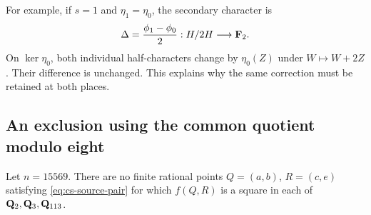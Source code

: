 For example, if $s=1$ and $\eta_1=\eta_0$, the secondary character is
\[
 \Delta=\frac{\phi_1-\phi_0}{2}:H/2H\longrightarrow\mathbf F_2.
\]
On $\ker\eta_0$, both individual half-characters change by $\eta_0(Z)$
under $W\mapsto W+2Z$.  Their difference is unchanged.  This explains
why the same correction must be retained at both places.

\subsection{An exclusion using the common quotient modulo eight}

\begin{theorem}\label{thm:cs-15569}
Let $n=15569$.  There are no finite rational points $Q=(a,b)$,
$R=(c,e)$ satisfying \eqref{eq:cs-source-pair} for which $f(Q,R)$ is a
square in each of $\mathbf Q_2,\mathbf Q_3,\mathbf Q_{113}$.
\end{theorem}

